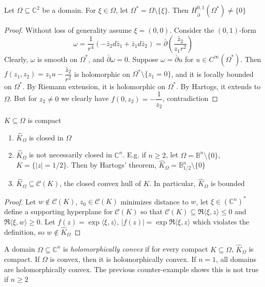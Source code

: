 \documentclass[../main.tex]{subfiles}
\begin{document}
\begin{example}
Let $\Omega\subseteq\mathbb C^2$ be a domain. For $\xi\in\Omega$, let $\Omega^*=\Omega\setminus\{\xi\}$. Then $H^{0,1}_{\bar\partial}(\Omega^*)\neq\{0\}$
\end{example}

\begin{proof}
Without loss of generality assume $\xi=(0,0)$. Consider the $(0,1)$-form
\[\omega=\frac{1}{r^4}(-\bar z_2d\bar z_1+\bar z_1d\bar z_2)=\bar\partial\left(\frac{\bar z_2}{z_1r^2}\right)\]
Clearly, $\omega$ is smooth on $\Omega^*$, and $\bar\partial\omega=0$. Suppose $\omega=\bar\partial u$ for $u\in C^\infty(\Omega^*)$. Then $f(z_1,z_2)=z_1u-\dfrac{\bar z_2}{r^2}$ is holomorphic on $\Omega^*\setminus\{z_1=0\}$, and it is locally bounded on $\Omega^*$. By Riemann extension, it is holomorphic on $\Omega^*$. By Hartogs, it extends to $\Omega$. But for $z_2\neq0$ we clearly have $f(0,z_2)=-\dfrac{1}{z_2}$, contradiction
\end{proof}

\begin{proposition}
$K\subseteq\Omega$ is compact
\begin{enumerate}
\item $\hat K_\Omega$ is closed in $\Omega$
\item $\hat K_\Omega$ is not necessarily closed in $\mathbb C^n$. E.g. if $n\geq2$, let $\Omega=\mathbb B^n\setminus\{0\}$, $K=\{|z|=1/2\}$. Then by Hartogs' theorem, $\hat K_\Omega=\mathbb B^n_{1/2}\setminus\{0\}$
\item $\hat K_\Omega\subseteq\mathcal C(K)$, the closed convex hull of $K$. In particular, $\hat K_\Omega$ is bounded
\end{enumerate}
\end{proposition}

\begin{proof}
Let $w\notin\mathcal C(K)$, $z_0\in\mathcal C(K)$ minimizes distance to $w$, let $\xi\in(\mathbb C^n)^*$ define a supporting hyperplane for $\mathcal C(K)$ so that $\mathcal C(K)\subseteq\Re\langle\xi,z\rangle\leq0$ and $\Re\langle\xi,w\rangle\geq0$. Let $f(z)=\exp\langle\xi,z\rangle$, $|f(z)|=\exp\Re\langle\xi,z\rangle$ which violates the definition, so $w\notin\hat K_\Omega$
\end{proof}

\begin{definition}
A domain $\Omega\subseteq\mathbb C^n$ is \textit{holomorphically convex} if for every compact $K\subseteq\Omega$, $\hat K_\Omega$ is compact. If $\Omega$ is convex, then it is holomorphically convex. If $n=1$, all domains are holomorphically convex. The previous counter-example shows this is not true if $n\geq2$
\end{definition}
\end{document}
